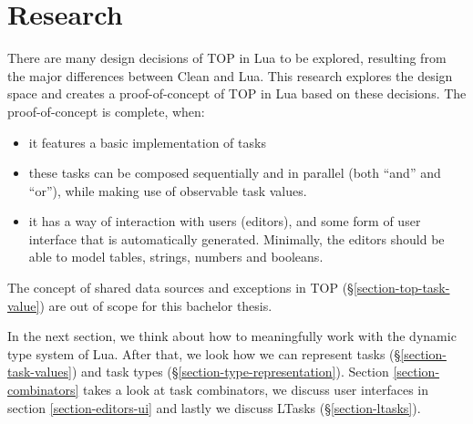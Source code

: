 \chapter{Research}\label{research}

There are many design decisions of TOP in Lua to be explored, resulting from the major differences between Clean and Lua. This research explores the design space and creates a proof-of-concept of TOP in Lua based on these decisions. The proof-of-concept is complete, when:
\begin{itemize}
    \item it features a basic implementation of tasks
    \item these tasks can be composed sequentially and in parallel (both ``and'' and ``or''), while making use of observable task values.
    \item it has a way of interaction with users (editors), and some form of user interface that is automatically generated. Minimally, the editors should be able to model tables, strings, numbers and booleans.
\end{itemize}

The concept of shared data sources and exceptions in TOP (\S \ref{section-top-task-value}) are out of scope for this bachelor thesis.

In the next section, we think about how to meaningfully work with the dynamic type system of Lua. After that, we look how we can represent tasks (\S \ref{section-task-values}) and task types (\S \ref{section-type-representation}). Section \ref{section-combinators} takes a look at task combinators, we discuss user interfaces in section \ref{section-editors-ui} and lastly we discuss LTasks (\S \ref{section-ltasks}).





\pagebreak



